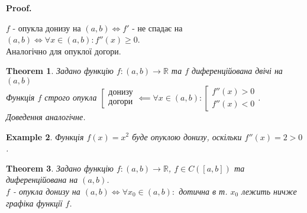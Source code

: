 \documentclass[a4paper, 14pt]{article}
\makeatletter
\def\qed{$\blacksquare$}
\theoremstyle{theoremdd}
\newtheorem{theorem}{Theorem}[subsection]
\theoremstyle{theoremdd}
\theoremstyle{theoremdd}
\theoremstyle{theoremdd}
\newtheorem{example}[theorem]{Example}
\theoremstyle{theoremdd}
\theoremstyle{theoremdd}
\theoremstyle{theoremdd}
\theoremstyle{theoremdd}
\renewenvironment{proof}[1][Proof.\\]{\par
\pushQED{\hfill \qed}%
\normalfont \topsep6\p@\@plus6\p@\relax
\trivlist
\item\relax
{\bfseries
#1\@addpunct{.}}\hspace\labelsep\ignorespaces
}{%
\popQED\endtrivlist\@endpefalse
}
\makeatother
\begin{document}
\begin{proof}
$f$ - опукла донизу на $(a,b) \iff f'$ - не спадає на $(a,b) \iff \forall x \in (a,b): f''(x) \geq 0$.\\
Аналогічно для опуклої догори.
\end{proof}

\begin{theorem}
Задано функцію $f: (a,b) \to \mathbb{R}$ та $f$ диференційована двічі на $(a,b)$\\
Функція $f$ строго опукла $\left[ \begin{gathered} \textrm{донизу} \\ \textrm{догори} \end{gathered} \right. \impliedby \forall x \in (a,b): \left[ \begin{gathered} f''(x) > 0 \\ f''(x) < 0 \end{gathered} \right.$.\\
\textit{Доведення аналогічне}.
\end{theorem}

\begin{example}
Функція $f(x) = x^2$ буде опуклою донизу, оскільки $f''(x) = 2 > 0$.
\end{example}

\iffalse
\begin{theorem}
Задано функцію $f: (a,b) \to \mathbb{R}$, $f \in C([a,b])$ та диференційована на $(a,b)$.\\
$f$ - опукла донизу на $(a,b) \iff \forall x_0 \in (a,b):$ дотична в т. $x_0$ лежить ничже графіка функції $f$.
\end{theorem}
\end{document}
